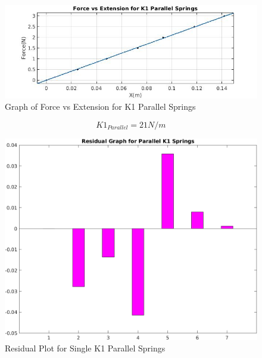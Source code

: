 \begin{center}
\begin{figure}[h!]
    \centering
    \includegraphics[width=\textwidth]{figures/K1_P.jpg}
    \caption{Graph of Force vs Extension for K1 Parallel Springs}
    \label{fig:k1_P}
\end{figure}
\end{center}
$$ K1_{Parallel} = 21 N/m $$
\newpage
\begin{center}
\begin{figure}[h!]
    \centering
    \includegraphics[width=\textwidth]{figures/K1_P_R.png}
    \caption{Residual Plot for Single K1 Parallel Springs}
    \label{fig:k1_P_R}
\end{figure}
\end{center}

